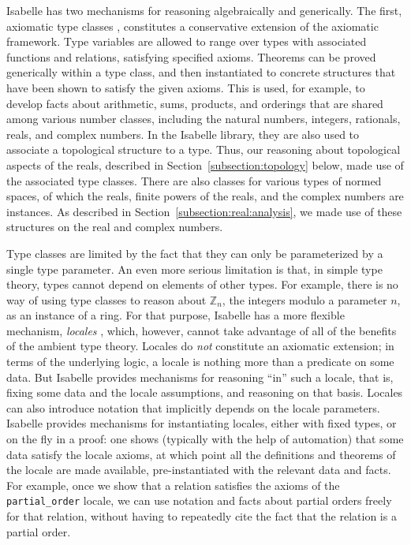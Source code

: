 \documentclass{svjour3}
\newcommand{\ZZ}{\mathbb{Z}}
\begin{document}
Isabelle has two mechanisms for reasoning algebraically and generically. The first, axiomatic type classes \cite{wenzel:97}, constitutes a conservative extension of the axiomatic framework. Type variables are allowed to range over types with associated functions and relations, satisfying specified axioms. Theorems can be proved generically within a type class, and then instantiated to concrete structures that have been shown to satisfy the given axioms. This is used, for example, to develop facts about arithmetic, sums, products, and orderings that are shared among various number classes, including the natural numbers, integers, rationals, reals, and complex numbers. In the Isabelle library, they are also used to associate a topological structure to a type. Thus, our reasoning about topological aspects of the reals, described in Section~\ref{subsection:topology} below, made use of the associated type classes. There are also classes for various types of normed spaces, of which the reals, finite powers of the reals, and the complex numbers are instances. As described in Section~\ref{subsection:real:analysis}, we made use of these structures on the real and complex numbers.

Type classes are limited by the fact that they can only be parameterized by a single type parameter. An even more serious limitation is that, in simple type theory, types cannot depend on elements of other types. For example, there is no way of using type classes to reason about $\ZZ_n$, the integers modulo a parameter $n$, as an instance of a ring. For that purpose, Isabelle has a more flexible mechanism, \emph{locales} \cite{ballarin:06}, which, however, cannot take advantage of all of the benefits of the ambient type theory. Locales do \emph{not} constitute an axiomatic extension; in terms of the underlying logic, a locale is nothing more than a predicate on some data. But Isabelle provides mechanisms for reasoning ``in'' such a locale, that is, fixing some data and the locale assumptions, and reasoning on that basis. Locales can also introduce notation that implicitly depends on the locale parameters. Isabelle provides mechanisms for instantiating locales, either with fixed types, or on the fly in a proof: one shows (typically with the help of automation) that some data satisfy the locale axioms, at which point all the definitions and theorems of the locale are made available, pre-instantiated with the relevant data and facts. For example, once we show that a relation satisfies the axioms of the \texttt{partial\_order} locale, we can use notation and facts about partial orders freely for that relation, without having to repeatedly cite the fact that the relation is a partial order.
\end{document}
